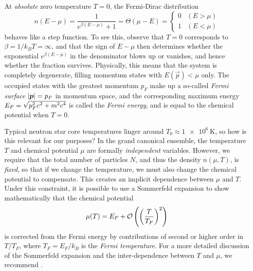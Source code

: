 At \emph{absolute} zero temperature $T = 0$, the Fermi-Dirac distribution
\begin{equation}
	n(E-\mu) = \frac{1}{e^{\beta (E - \mu)} + 1} = \Theta(\mu-E) = \begin{cases} 0 & (E > \mu) \\ 1 & (E < \mu) \end{cases}
\end{equation}
behaves like a step function.
To see this, observe that $T = 0$ corresponds to $\beta = 1 / k_B T = \infty$, and that the sign of $E - \mu$ then determines whether the exponential $e^{\beta (E - \mu)}$ in the denominator blows up or vanishes, and hence whether the fraction survives.
Physically, this means that the system is completely degenerate, filling momentum states with $E(\vec{p}) < \mu$ only.
The occupied states with the greatest momentum $p_F$ make up a so-called \emph{Fermi surface} $\left\lvert {\bm{p}} \right\rvert = p_F$ in momentum space, and the corresponding maximum energy $E_F = \sqrt{\smash[b]{p_F^2 c^2 + m^2 c^4}}$ is called the \emph{Fermi energy}, and is equal to the chemical potential when $T = 0$.

Typical neutron star core temperatures linger around $T_0 \approx \SI{1e6}{\kelvin}$, \cite{ref:glendenning} so how is this relevant for our purposes?
In the grand canonical ensemble, the temperature $T$ and chemical potential $\mu$ are formally \emph{independent} variables.
However, we require that the total number of particles $N$, and thus the density $n(\mu, T)$, is \emph{fixed}, so that if we change the temperature, we must also change the chemical potential to compensate.
This creates an implicit dependence between $\mu$ and $T$.
Under this constraint, it is possible to use a Sommerfeld expansion to show mathematically that the chemical potential
\begin{equation}
	\mu(T) = E_F + \mathcal{O} \left( \left( \frac{T}{T_F} \right)^2 \right)
\end{equation}
is corrected from the Fermi energy by contributions of second or higher order in $T / T_F$, where $T_F = E_F / k_B$ is the \emph{Fermi temperature}.
For a more detailed discussion of the Sommerfeld expansion and the inter-dependence between $T$ and $\mu$, we recommend \cite[section 3.6]{ref:notes_statistical_physics_tong}.%

